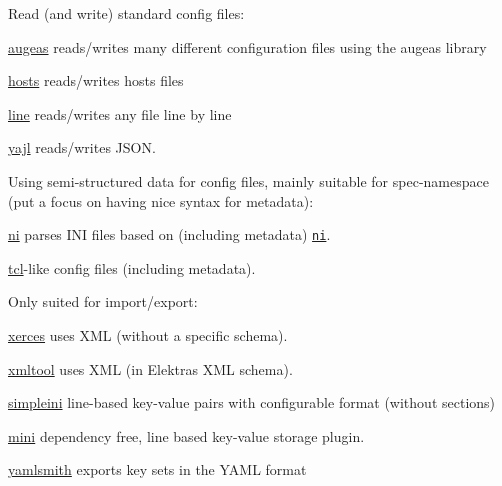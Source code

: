 Read (and write) standard config files\+:


\begin{DoxyItemize}
\item \hyperlink{md_src_plugins_augeas_README_src_plugins_augeas_README_md}{augeas} reads/writes many different configuration files using the augeas library
\item \hyperlink{md_src_plugins_hosts_README_src_plugins_hosts_README_md}{hosts} reads/writes hosts files
\item \hyperlink{md_src_plugins_line_README_src_plugins_line_README_md}{line} reads/writes any file line by line
\item \hyperlink{md_src_plugins_yajl_README_src_plugins_yajl_README_md}{yajl} reads/writes J\+S\+ON.
\end{DoxyItemize}

Using semi-\/structured data for config files, mainly suitable for spec-\/namespace (put a focus on having nice syntax for metadata)\+:


\begin{DoxyItemize}
\item \hyperlink{md_src_plugins_ni_README_src_plugins_ni_README_md}{ni} parses I\+NI files based on (including metadata) \href{https://github.com/chazomaticus/bohr/blob/master/include/bohr/ni.h}{\tt ni}.
\item \hyperlink{md_src_plugins_tcl_README_src_plugins_tcl_README_md}{tcl}-\/like config files (including metadata).
\end{DoxyItemize}

Only suited for import/export\+:


\begin{DoxyItemize}
\item \hyperlink{md_src_plugins_xerces_README_src_plugins_xerces_README_md}{xerces} uses X\+ML (without a specific schema).
\item \hyperlink{md_src_plugins_xmltool_README_src_plugins_xmltool_README_md}{xmltool} uses X\+ML (in Elektra\textquotesingle{}s X\+ML schema).
\item \hyperlink{md_src_plugins_simpleini_README_src_plugins_simpleini_README_md}{simpleini} line-\/based key-\/value pairs with configurable format (without sections)
\item \hyperlink{md_src_plugins_mini_README_src_plugins_mini_README_md}{mini} dependency free, line based key-\/value storage plugin.
\item \hyperlink{md_src_plugins_yamlsmith_README_src_plugins_yamlsmith_README_md}{yamlsmith} exports key sets in the Y\+A\+ML format
\end{DoxyItemize}

